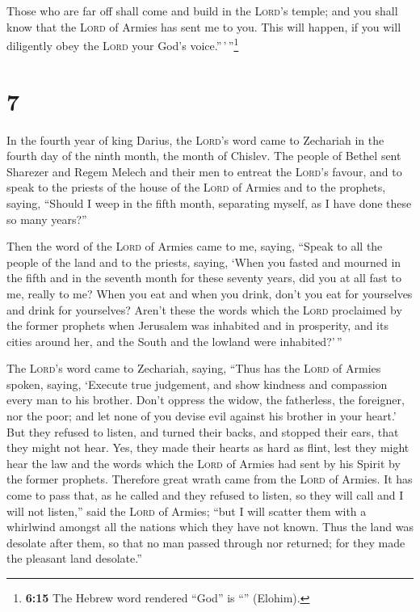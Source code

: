  Those who are far off shall come and build in the
\textsc{Lord}'s temple; and you shall know that the \textsc{Lord} of
Armies has sent me to you. This will happen, if you will diligently obey
the \textsc{Lord} your God's voice.''\,'\,''\footnote{\textbf{6:15} The
  Hebrew word rendered ``God'' is ``'' (Elohim).}

\hypertarget{section-6}{%
\section{7}\label{section-6}}

 In the fourth year of king Darius, the \textsc{Lord}'s
word came to Zechariah in the fourth day of the ninth month, the month
of Chislev.  The people of Bethel sent Sharezer and Regem
Melech and their men to entreat the \textsc{Lord}'s favour,
 and to speak to the priests of the house of the
\textsc{Lord} of Armies and to the prophets, saying, ``Should I weep in
the fifth month, separating myself, as I have done these so many
years?''

 Then the word of the \textsc{Lord} of Armies came to me,
saying,  ``Speak to all the people of the land and to the
priests, saying, `When you fasted and mourned in the fifth and in the
seventh month for these seventy years, did you at all fast to me, really
to me?  When you eat and when you drink, don't you eat for
yourselves and drink for yourselves?  Aren't these the
words which the \textsc{Lord} proclaimed by the former prophets when
Jerusalem was inhabited and in prosperity, and its cities around her,
and the South and the lowland were inhabited?'\,''

 The \textsc{Lord}'s word came to Zechariah, saying,
 ``Thus has the \textsc{Lord} of Armies spoken, saying,
`Execute true judgement, and show kindness and compassion every man to
his brother.  Don't oppress the widow, the fatherless,
the foreigner, nor the poor; and let none of you devise evil against his
brother in your heart.'  But they refused to listen, and
turned their backs, and stopped their ears, that they might not hear.
 Yes, they made their hearts as hard as flint, lest they
might hear the law and the words which the \textsc{Lord} of Armies had
sent by his Spirit by the former prophets. Therefore great wrath came
from the \textsc{Lord} of Armies.  It has come to pass
that, as he called and they refused to listen, so they will call and I
will not listen,'' said the \textsc{Lord} of Armies; 
``but I will scatter them with a whirlwind amongst all the nations which
they have not known. Thus the land was desolate after them, so that no
man passed through nor returned; for they made the pleasant land
desolate.''

